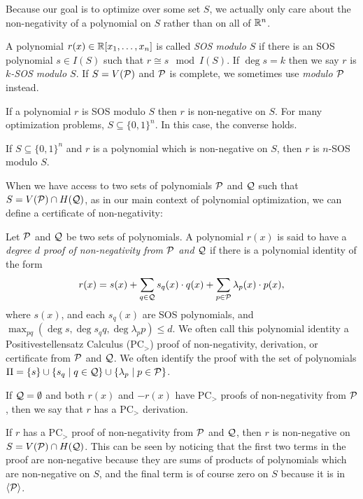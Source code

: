 Because our goal is to optimize over some set $S$, we actually only care about the non-negativity of a polynomial on $S$ rather than on all of $\mathbb R^n$.

\begin{definition}
A polynomial $r(x) \in \mathbb R[x_1,\dots,x_n]$ is called \emph{SOS modulo $S$} if there is an SOS polynomial $s \in I(S)$ such that $r \cong s \mod I(S)$. If $\deg s = k$ then we say $r$ is \emph{$k$-SOS modulo $S$}. If $S = V(\mathcal P)$ and $\mathcal P$ is complete, we sometimes use \emph{modulo $\mathcal P$} instead.
\end{definition}
If a polynomial $r$ is SOS modulo $S$ then $r$ is non-negative on $S$. For many optimization problems, $S \subseteq \{0,1\}^n$. In this case, the converse holds.
\begin{fact}\label{fact:boolSOS}
If $S \subseteq \{0,1\}^n$ and $r$ is a polynomial which is non-negative on $S$, then $r$ is $n$-SOS modulo $S$.
\end{fact}

When we have access to two sets of polynomials $\mathcal P$ and $\mathcal Q$ such that $S = V(\mathcal P) \cap H(\mathcal Q)$, as in our main context of polynomial optimization, we can define a certificate of non-negativity:

\begin{definition}
Let $\mathcal P$ and $\mathcal Q$ be two sets of polynomials. A polynomial $r(x)$ is said to have a \emph{degree $d$ proof of non-negativity from $\mathcal P$ and $\mathcal Q$} if there is a polynomial identity of the form
\[r(x) = s(x) + \sum_{q \in \mathcal Q} s_q(x) \cdot q(x) + \sum_{p \in \mathcal P} \lambda_p(x) \cdot p(x),\]
where $s(x)$, and each $s_q(x)$ are SOS polynomials, and $\max_{pq}(\deg s, \deg s_qq, \deg \lambda_pp) \leq d$. We often call this polynomial identity a Positivestellensatz Calculus (PC$_>$) proof of non-negativity, derivation, or certificate from $\mathcal P$ and $\mathcal Q$.
We often identify the proof with the set of polynomials $\Pi = \{s\} \cup \{s_q \mid q\in \mathcal Q\} \cup \{\lambda_p \mid p \in \mathcal P\}$.

If $\mathcal Q = \emptyset$ and both $r(x)$ and $-r(x)$ have PC$_>$ proofs of non-negativity from $\mathcal P$, then we say that $r$ has a PC$_>$ derivation.
\end{definition}

If $r$ has a PC$_>$ proof of non-negativity from $\mathcal P$ and $\mathcal Q$, then $r$ is non-negative on $S = V(\mathcal P) \cap H(\mathcal Q)$. This can be seen by noticing that the first two terms in the proof are non-negative because they are sums of products of polynomials which are non-negative on $S$, and the final term is of course zero on $S$ because it is in $\langle \mathcal P \rangle$.


